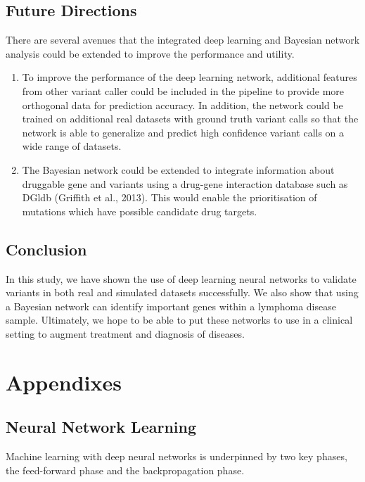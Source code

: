 \documentclass{article}
\begin{document}
\subsection{Future Directions}
There are several avenues that the integrated deep learning and Bayesian network analysis could be extended to improve the performance and utility.
\begin{enumerate}
	\item To improve the performance of the deep learning network, additional features from other variant caller could be included in the pipeline to provide more orthogonal data for prediction accuracy. In addition, the network could be trained on additional real datasets with ground truth variant calls so that the network is able to generalize and predict high confidence variant calls on a wide range of datasets.
	\item The Bayesian network could be extended to integrate information about druggable gene and variants using a drug-gene interaction database such as DGldb (Griffith et al., 2013). This would enable the prioritisation of mutations which have possible candidate drug targets. 
\end{enumerate}
\subsection{Conclusion}
In this study, we have shown the use of deep learning neural networks to validate variants in both real and simulated datasets successfully. We also show that using a Bayesian network can identify important genes within a lymphoma disease sample. Ultimately, we hope to be able to put these networks to use in a clinical setting to augment treatment and diagnosis of diseases.


\newpage
\section{Appendixes}

\subsection{Neural Network Learning}
Machine learning with deep neural networks is underpinned by two key phases, the feed-forward phase and the backpropagation phase. 
\end{document}
